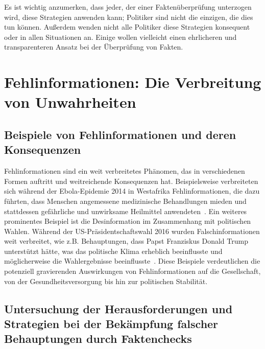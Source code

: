 \documentclass[a4paper,listof=totoc,bibliography=totoc]{scrartcl}
\begin{document}
Es ist wichtig anzumerken, dass jeder, der einer Faktenüberprüfung unterzogen wird, diese Strategien anwenden kann; Politiker sind nicht die einzigen, die dies tun können. 
Außerdem wenden nicht alle Politiker diese Strategien konsequent oder in allen Situationen an. Einige wollen vielleicht einen ehrlicheren und transparenteren Ansatz bei 
der Überprüfung von Fakten.

\section{Fehlinformationen: Die Verbreitung von Unwahrheiten}

\subsection{Beispiele von Fehlinformationen und deren Konsequenzen}

Fehlinformationen sind ein weit verbreitetes Phänomen, das in verschiedenen Formen auftritt und weitreichende Konsequenzen hat. Beispielsweise verbreiteten sich 
während der Ebola-Epidemie 2014 in Westafrika Fehlinformationen, die dazu führten, dass Menschen angemessene medizinische Behandlungen mieden und stattdessen gefährliche 
und unwirksame Heilmittel anwendeten~\cite{vinck2019}. 
Ein weiteres prominentes Beispiel ist die Desinformation im Zusammenhang mit politischen Wahlen. Während der US-Präsidentschaftswahl 2016 wurden Falschinformationen weit 
verbreitet, wie z.B. Behauptungen, dass Papst Franziskus Donald Trump unterstützt hätte, was das politische Klima erheblich beeinflusste und möglicherweise die Wahlergebnisse 
beeinflusste~\cite{allcott2017}.
Diese Beispiele verdeutlichen die potenziell gravierenden Auswirkungen von Fehlinformationen auf die Gesellschaft, von der Gesundheitsversorgung bis hin zur politischen Stabilität.

\subsection{Untersuchung der Herausforderungen und Strategien bei der Bekämpfung falscher Behauptungen durch Faktenchecks}

\end{document}
